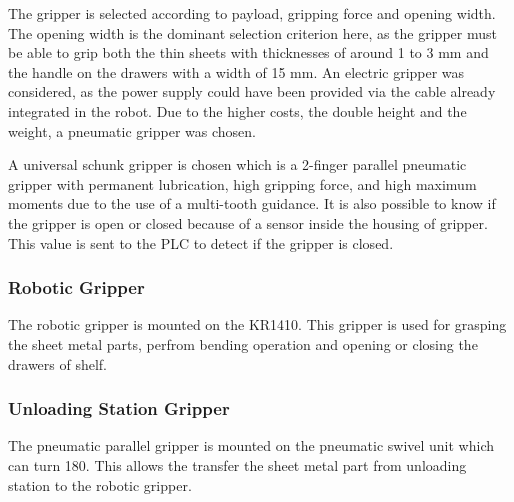 The gripper is selected according to payload, gripping force and opening width. The
opening width is the dominant selection criterion here, as the gripper must be able to grip both the thin
sheets with thicknesses of around 1 to 3 mm and the handle on the drawers with a width of 15 mm. An
electric gripper was considered, as the power supply could have been provided via the cable
already integrated in the robot. Due to the higher costs, the double height and the weight, a pneumatic
gripper was chosen. 

A universal schunk gripper is chosen which is a 
2-finger parallel pneumatic gripper with permanent lubrication, high gripping force, and high maximum moments due to the use of a multi-tooth guidance. \cite{schunk-gripper}
It is also possible to know if the gripper is open or closed because of a sensor inside the housing of gripper. This value is sent to the PLC to
detect if the gripper is closed.


\subsubsection{Robotic Gripper}
\label{subsubsec:robotic-gripper}
The robotic gripper is mounted on the KR1410. This gripper is used for grasping the sheet metal parts, perfrom bending operation and opening or closing the drawers of shelf.

\subsubsection{Unloading Station Gripper}
\label{subsubsec:unloading-gripper}
The pneumatic parallel gripper is mounted on the pneumatic swivel unit which can turn 180\textdegree. This allows the transfer the 
sheet metal part from unloading station to the robotic gripper.